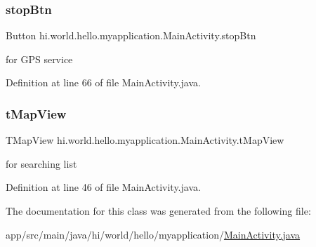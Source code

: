 \subsubsection{\texorpdfstring{stopBtn}{stopBtn}}
{\footnotesize\ttfamily Button hi.\+world.\+hello.\+myapplication.\+Main\+Activity.\+stop\+Btn\hspace{0.3cm}{\ttfamily [private]}}



for G\+PS service 



Definition at line 66 of file Main\+Activity.\+java.

\mbox{\label{classhi_1_1world_1_1hello_1_1myapplication_1_1_main_activity_a99006b1a0a4da0f230364e38d46f1741}} 
\subsubsection{\texorpdfstring{tMapView}{tMapView}}
{\footnotesize\ttfamily T\+Map\+View hi.\+world.\+hello.\+myapplication.\+Main\+Activity.\+t\+Map\+View\hspace{0.3cm}{\ttfamily [private]}}



for searching list 



Definition at line 46 of file Main\+Activity.\+java.



The documentation for this class was generated from the following file\+:\begin{DoxyCompactItemize}
\item 
app/src/main/java/hi/world/hello/myapplication/\mbox{\hyperlink{_main_activity_8java}{Main\+Activity.\+java}}\end{DoxyCompactItemize}
